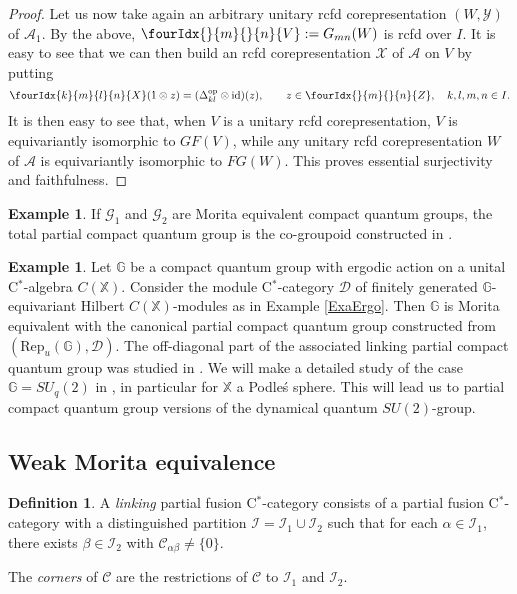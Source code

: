 \documentclass[10pt]{article}
\DeclareMathOperator{\id}{id}
\DeclareMathOperator{\op}{\mathrm{op}}
\newcommand{\G}{\mathbb{G}}
\newcommand{\X}{\mathbb{X}}
\newcommand{\CatC}{\mathcal{C}}
\newcommand{\CatD}{\mathcal{D}}
\newcommand{\CatCC}{\mathscr{C}}
\newcommand{\Rep}{\mathrm{Rep}}
\newcommand{\Gr}[5]{\fourIdx{#2}{#4}{#3}{#5}{#1}}%
\newcommand{\Gru}[3]{\Gr{#1}{}{}{#2}{#3}}
\theoremstyle{definition}
\newtheorem{Def}[Theorem]{Definition}
\newtheorem{Exa}[Theorem]{Example}
\numberwithin{equation}{section}
\begin{document}
\begin{proof}
Let us now take again an arbitrary unitary rcfd corepresentation $(W,\mathscr{Y})$ of $\mathscr{A}_1$. By the above, $\Gru{V}{m}{n} := G_{mn}(W)$ is rcfd over $I$. It is easy to see that we can then build an rcfd corepresentation $\mathscr{X}$ of $\mathscr{A}$ on $V$ by putting \[\Gr{X}{k}{l}{m}{n}(1\otimes z) = (\Delta_{kl}^{\op}\otimes \id)(z),\qquad z\in \Gru{Z}{m}{n}, \quad k,l,m,n\in I.\] It is then easy to see that, when $V$ is a unitary rcfd corepresentation, $V$ is equivariantly isomorphic to $GF(V)$, while any unitary rcfd corepresentation $W$ of $\mathscr{A}$ is equivariantly isomorphic to $FG(W)$. This proves essential surjectivity and faithfulness.
\end{proof}

\begin{Exa} If $\mathscr{G}_1$ and $\mathscr{G}_2$ are Morita equivalent compact quantum groups, the total partial compact quantum group is the co-groupoid constructed in \cite{Bic1}. 
\end{Exa}

\begin{Exa}  Let $\G$ be a compact quantum group with ergodic action on a unital C$^*$-algebra $C(\mathbb{X})$. Consider the module C$^*$-category $\CatD$ of finitely generated $\G$-equivariant Hilbert $C(\mathbb{X})$-modules as in Example \ref{ExaErgo}. Then $\G$ is Morita equivalent with the canonical partial compact quantum group constructed from $(\Rep_u(\G),\CatD)$. The off-diagonal part of the associated linking partial compact quantum group was studied in \cite{DCY1}. We will make a detailed study of the case $\G = SU_q(2)$ in \cite{DCT2}, in particular for $\X$ a Podle\'{s} sphere. This will lead us to partial compact quantum group versions of the dynamical quantum $SU(2)$-group.
\end{Exa}


\subsection{Weak Morita equivalence}

\begin{Def} A \emph{linking} partial fusion C$^*$-category consists of a partial fusion C$^*$-category with a distinguished partition $\mathscr{I} =\mathscr{I}_1 \cup \mathscr{I}_2$ such that for each $\alpha\in \mathscr{I}_1$, there exists $\beta \in \mathscr{I}_{2}$ with $\CatC_{\alpha\beta}\neq \{0\}$.

The \emph{corners} of $\CatCC$ are the restrictions of $\CatCC$ to $\mathscr{I}_1$ and $\mathscr{I}_2$.
\end{Def}
\end{document}
